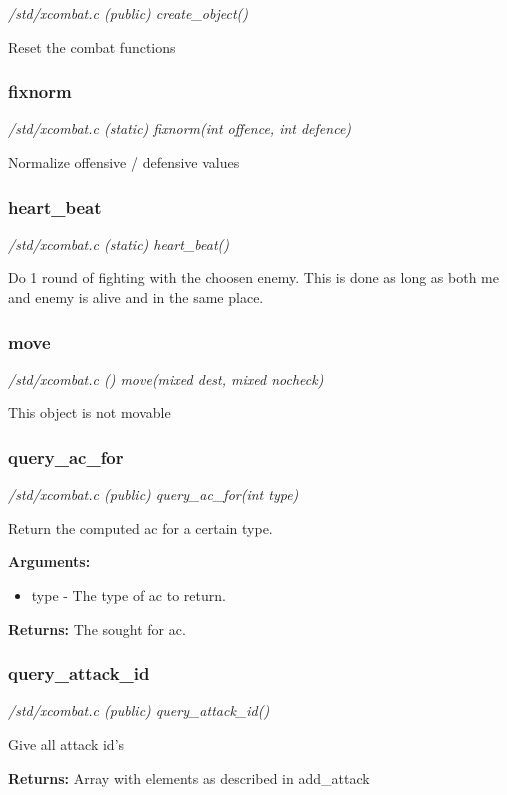 {\em /std/xcombat.c (public) create\_object()}

Reset the combat functions


\subsubsection{fixnorm}

{\em /std/xcombat.c (static) fixnorm(int offence, int defence)}

Normalize offensive / defensive values


\subsubsection{heart\_beat}

{\em /std/xcombat.c (static) heart\_beat()}

Do 1 round of fighting with the choosen enemy. This is
done as long as both me and enemy is alive and in the
same place.


\subsubsection{move}

{\em /std/xcombat.c () move(mixed dest, mixed nocheck)}

This object is not movable


\subsubsection{query\_ac\_for}

{\em /std/xcombat.c (public) query\_ac\_for(int type)}

Return the computed ac for a certain type.

{\bf Arguments:}
\begin{itemize}
\item     type - The type of ac to return.
\end{itemize}

{\bf Returns:}        The sought for ac.


\subsubsection{query\_attack\_id}

{\em /std/xcombat.c (public) query\_attack\_id()}

Give all attack id's

{\bf Returns:}        Array with elements as described in add\_attack


